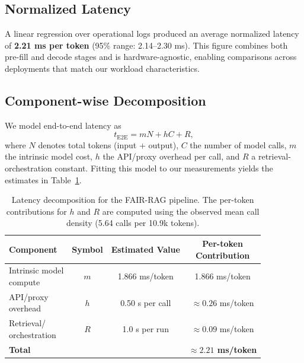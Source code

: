 \documentclass[11pt]{article}
\begin{document}
\subsection{Normalized Latency}

A linear regression over operational logs produced an average normalized latency of \textbf{2.21 ms per token} (95\% range: 2.14--2.30 ms). This figure combines both pre-fill and decode stages and is hardware-agnostic, enabling comparisons across deployments that match our workload characteristics.

\subsection{Component-wise Decomposition}

We model end-to-end latency as
\begin{equation}
  t_{\mathrm{E2E}} = mN + hC + R,
\end{equation}
where $N$ denotes total tokens (input + output), $C$ the number of model calls, $m$ the intrinsic model cost, $h$ the API/proxy overhead per call, and $R$ a retrieval-orchestration constant. Fitting this model to our measurements yields the estimates in Table~\ref{tab:latency-decomp}.

\begin{table}[t]
\centering
\small
\begingroup
\setlength{\tabcolsep}{8pt}
\begin{tabular}{lccc}
\hline
  {\bfseries Component} & {\bfseries Symbol} & {\bfseries Estimated Value} & \shortstack{{\bfseries Per-token}\\{\bfseries Contribution}} \\
\hline
\shortstack{Intrinsic model\\compute} & $m$ & 1.866 ms/token & 1.866 ms/token \\
\shortstack{API/proxy\\overhead} & $h$ & 0.50 s per call & $\approx 0.26$ ms/token \\
\shortstack{Retrieval/\\orchestration} & $R$ & 1.0 s per run & $\approx 0.09$ ms/token \\
  {\bfseries Total} & & & {\bfseries $\approx 2.21$ ms/token} \\
\hline
\end{tabular}
\endgroup
\caption{Latency decomposition for the FAIR-RAG pipeline. The per-token contributions for $h$ and $R$ are computed using the observed mean call density (5.64 calls per 10.9k tokens).}
\label{tab:latency-decomp}
\end{table}
\end{document}
